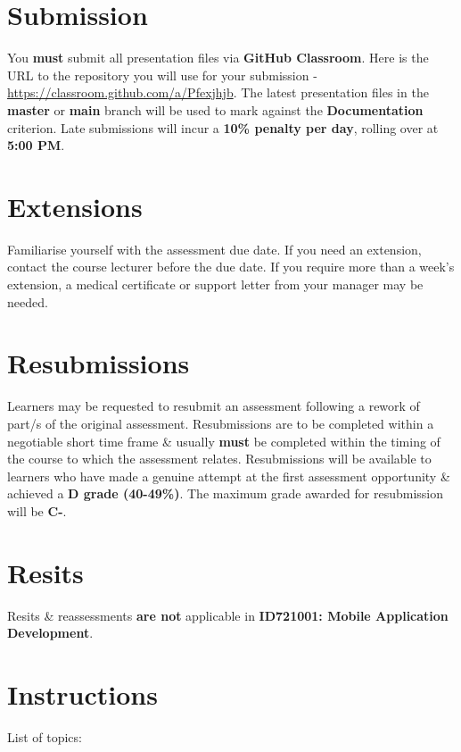 \documentclass{article}
\begin{document}
\section*{Submission}
You \textbf{must} submit all presentation files via \textbf{GitHub Classroom}. Here is the URL to the repository you will use for your submission - \href{https://classroom.github.com/a/Pfexjhjb}{https://classroom.github.com/a/Pfexjhjb}. The latest presentation files in the \textbf{master} or \textbf{main} branch will be used to mark against the \textbf{Documentation} criterion. Late submissions will incur a \textbf{10\% penalty per day}, rolling over at \textbf{5:00 PM}.

\section*{Extensions}
Familiarise yourself with the assessment due date. If you need an extension, contact the course lecturer before the due date. If you require more than a week's extension, a medical certificate or support letter from your manager may be needed.

\section*{Resubmissions}
Learners may be requested to resubmit an assessment following a rework of part/s of the original assessment. Resubmissions are to be completed within a negotiable short time frame \& usually \textbf{must} be completed within the timing of the course to which the assessment relates. Resubmissions will be available to learners who have made a genuine attempt at the first assessment opportunity \& achieved a \textbf{D grade (40-49\%)}. The maximum grade awarded for resubmission will be \textbf{C-}.

\section*{Resits}
Resits \& reassessments \textbf{are not} applicable in \textbf{ID721001: Mobile Application Development}.

\section*{Instructions}

List of topics:
\end{document}
